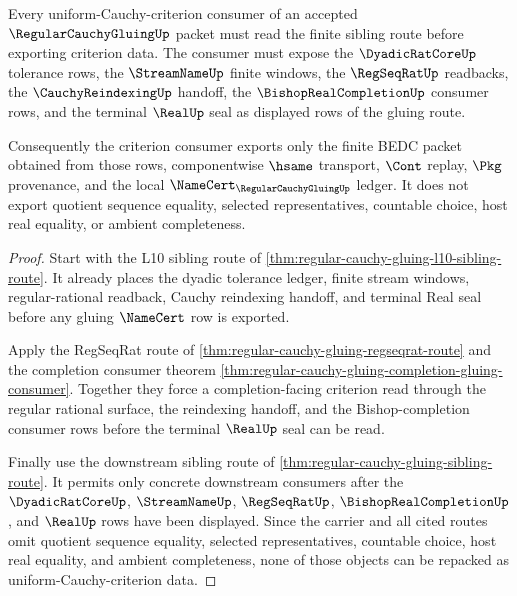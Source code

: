 \begin{theorem}
\label{thm:regular-cauchy-gluing-uniform-cauchy-criterion-route}
Every uniform-Cauchy-criterion consumer of an accepted $\RegularCauchyGluingUp$ packet must read the finite sibling route before exporting criterion data. The consumer must expose the $\DyadicRatCoreUp$ tolerance rows, the $\StreamNameUp$ finite windows, the $\RegSeqRatUp$ readbacks, the $\CauchyReindexingUp$ handoff, the $\BishopRealCompletionUp$ consumer rows, and the terminal $\RealUp$ seal as displayed rows of the gluing route.

Consequently the criterion consumer exports only the finite BEDC packet obtained from those rows, componentwise $\hsame$ transport, $\Cont$ replay, $\Pkg$ provenance, and the local $\NameCert_{\RegularCauchyGluingUp}$ ledger. It does not export quotient sequence equality, selected representatives, countable choice, host real equality, or ambient completeness.
\end{theorem}
\begin{proof}
Start with the L10 sibling route of \autoref{thm:regular-cauchy-gluing-l10-sibling-route}. It already places the dyadic tolerance ledger, finite stream windows, regular-rational readback, Cauchy reindexing handoff, and terminal Real seal before any gluing $\NameCert$ row is exported.

Apply the RegSeqRat route of \autoref{thm:regular-cauchy-gluing-regseqrat-route} and the completion consumer theorem \autoref{thm:regular-cauchy-gluing-completion-gluing-consumer}. Together they force a completion-facing criterion read through the regular rational surface, the reindexing handoff, and the Bishop-completion consumer rows before the terminal $\RealUp$ seal can be read.

Finally use the downstream sibling route of \autoref{thm:regular-cauchy-gluing-sibling-route}. It permits only concrete downstream consumers after the $\DyadicRatCoreUp$, $\StreamNameUp$, $\RegSeqRatUp$, $\BishopRealCompletionUp$, and $\RealUp$ rows have been displayed. Since the carrier and all cited routes omit quotient sequence equality, selected representatives, countable choice, host real equality, and ambient completeness, none of those objects can be repacked as uniform-Cauchy-criterion data.
\end{proof}

